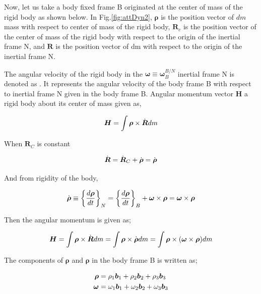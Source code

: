 Now, let us take a body fixed frame B originated at the center of mass of the 
rigid body as shown below. In Fig.\ref{fig:attDyn2}, $\bm{\rho}$  is the position vector of $dm$ 
mass with respect to center of mass of the rigid body, $\bm{R}_c$ is the 
position vector of the center of mass of the rigid body with respect to the origin 
of the inertial frame N, and $\bm{R}$ is the position vector of dm with respect to 
the origin of the inertial frame N. 

The angular velocity of the rigid body in the $\bm{\omega} \equiv \bm{\omega}_B^{B/N}$
inertial frame N is denoted as . It represents the angular velocity of the body frame B 
with respect to inertial frame N given in the body frame B. Angular momentum vector $\bm{H}$ 
a rigid body about its center of mass given as,

\begin{equation}{\label{eqn:kinematicEquDQM}}
\bm{H} = \int \bm{\rho} \times \dot{\bm{R}} dm
\end{equation}

When $\bm{R}_C$ is constant

\begin{equation}{\label{eqn:kinematicEquDQM}}
\dot{\bm{R}} = \dot{\bm{R}}_C + \dot{\bm{\rho}} = \dot{\bm{\rho}}
\end{equation}

And from rigidity of the body,

\begin{equation}{\label{eqn:kinematicEquDQM}}
\dot{\bm{\rho}} \equiv \bigg\{ \frac{d\bm{\rho}}{dt} \bigg\}_N = \bigg\{ \frac{d\bm{\rho}}{dt} \bigg\}_B + \bm{\omega} \times \bm{\rho} = \bm{\omega} \times \bm{\rho}
\end{equation}

Then the angular momentum is given as;

\begin{equation}{\label{eqn:kinematicEquDQM}}
\bm{H} = \int \bm{\rho} \times \dot{\bm{R}} dm = \int \bm{\rho} \times \dot{\bm{\rho}} dm = \int \bm{\rho} \times  (\bm{\omega} \times \bm{\rho} )dm
\end{equation}

The components of $\bm{\rho}$ and $\bm{\rho}$ in the body frame B is written as;

\begin{align}{\label{eqn:omega_and_rho}}
\begin{split}
\bm{\rho} & = \rho_1 \bm{b}_1 + \rho_2 \bm{b}_2 + \rho_3 \bm{b}_3 \\
\bm{\omega} & = \omega_1 \bm{b}_1 + \omega_2 \bm{b}_2 + \omega_3 \bm{b}_3 \\
\end{split}
\end{align}

